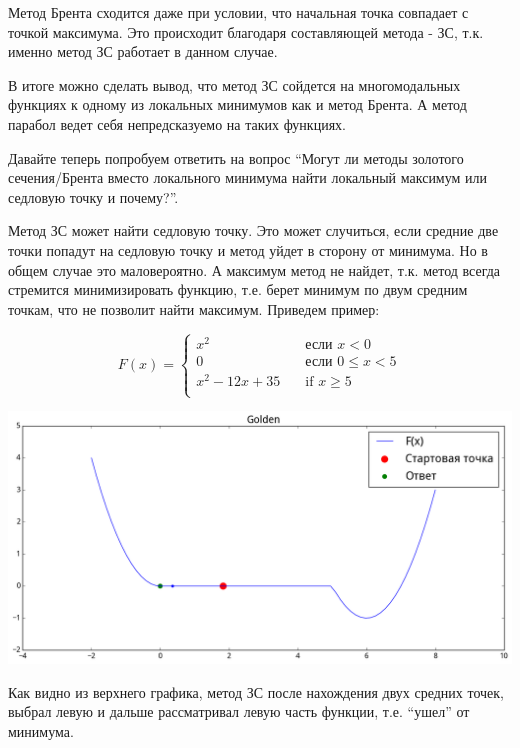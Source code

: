 \documentclass[12pt, a4paper]{article}
\begin{document}
        Метод Брента сходится даже при условии, что начальная точка совпадает с точкой максимума. Это происходит благодаря составляющей метода - ЗС, т.к. именно метод ЗС работает в данном случае.

        В итоге можно сделать вывод, что метод ЗС сойдется на многомодальных функциях к одному из локальных минимумов как и метод Брента. А метод парабол ведет себя непредсказуемо на таких функциях.

        Давайте теперь попробуем ответить на вопрос ``Могут ли методы золотого сечения/Брента вместо локального минимума найти локальный максимум или седловую точку и почему?''.

        Метод ЗС может найти седловую точку. Это может случиться, если средние две точки попадут на седловую точку и метод уйдет в сторону от минимума. Но в общем случае это маловероятно. А максимум метод не найдет, т.к. метод всегда стремится минимизировать функцию, т.е. берет минимум по двум средним точкам, что не позволит найти максимум. Приведем пример:

        \[ F(x) =
        \begin{cases}
            x^2       & \quad \text{если } x < 0 \\
            0         & \quad \text{если } 0 \leq x < 5 \\
            x^2 - 12 x + 35 & \quad \text{if } x \geq 5 \\
        \end{cases}
        \]

        \begin{center}\includegraphics[width=\picwidth, height=\picheight]{pics/spec_func_golden.png}\end{center}

        Как видно из верхнего графика, метод ЗС после нахождения двух средних точек, выбрал левую и дальше рассматривал левую часть функции, т.е. ``ушел'' от минимума.
\end{document}
